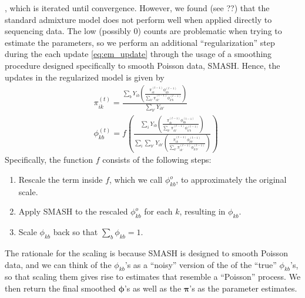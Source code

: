 \documentclass[11pt]{article}
\begin{document}
, which is iterated until convergence.
However, we found (see ??) that the standard admixture model does not perform well when applied directly to sequencing data. The low (possibly 0) counts are problematic when trying to estimate the parameters, so we perform an additional ``regularization'' step during the each update \ref{eq:em_update} through the usage of a smoothing procedure designed specifically to smooth Poisson data, SMASH. Hence, the updates in the regularized model is given by
\begin{eqnarray}\label{eq:em_update_reg}
&{\pi}_{ik}^{(t)}=\frac{\sum_b Y_{ib}\left(\frac{\pi_{ik}^{(t-1)}{\phi}_{kb}^{(t-1)}}{\sum_{k'}\pi_{ik'}^{(t-1)}{\phi}_{k'b}^{(t-1)}}\right)}{\sum_{b'}Y_{ib'}}\\
&{\phi}_{kb}^{(t)}=f\left(\frac{\sum_i Y_{ib}\left(\frac{\pi_{ik}^{(t-1)}{\phi}_{kb}^{(t-1)}}{\sum_{k'}\pi_{ik'}^{(t-1)}{\phi}_{k'b}^{(t-1)}}\right)}{\sum_i\sum_{b'} Y_{ib'}\left(\frac{\pi_{ik}^{(t-1)}{\phi}_{kb'}^{(t-1)}}{\sum_{k'}\pi_{ik'}^{(t-1)}{\phi}_{k'b'}^{(t-1)}}\right)}\right)
\end{eqnarray}
Specifically, the function $f$ consists of the following steps:
\begin{enumerate}
\item Rescale the term inside $f$, which we call $\phi_{kb}^o$, to approximately the original scale.
\item Apply SMASH to the rescaled $\phi_{kb}^o$ for each $k$, resulting in ${\phi}_{kb}$.
\item Scale ${\phi}_{kb}$ back so that $\sum_b{\phi}_{kb}=1$. 
\end{enumerate}
The rationale for the scaling is because SMASH is designed to smooth Poisson data, and we can think of the $\phi_{kb}$'s as a ``noisy'' version of the of the ``true'' $\phi_{kb}$'s, so that scaling them gives rise to estimates that resemble a ``Poisson'' process. We then return the final smoothed $\bm{\phi}$'s as well as the $\bm{\pi}$'s as the parameter estimates.
\end{document}
